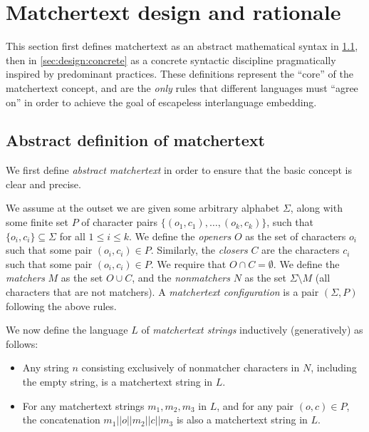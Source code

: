 \section{Matchertext design and rationale}
\label{sec:design}

This section first defines matchertext 
as an abstract mathematical syntax in \cref{sec:design:abstract},
then in \cref{sec:design:concrete}
as a concrete syntactic discipline
pragmatically inspired by predominant practices.
These definitions represent the ``core'' of the matchertext concept,
and are the \emph{only} rules
that different languages must ``agree on''
in order to achieve the goal of escapeless interlanguage embedding.

\subsection{Abstract definition of matchertext}
\label{sec:design:abstract}

We first define \emph{abstract matchertext}
in order to ensure that the basic concept is clear and precise.


We assume at the outset we are given some arbitrary alphabet $\Sigma$,
along with some finite set $P$ of character pairs 
$\{(o_1,c_1),\dots,(o_k,c_k)\}$,
such that $\{o_i, c_i\} \subseteq \Sigma$ for all $1 \le i \le k$.
We define the \emph{openers} $O$ as the set of characters $o_i$
such that some pair $(o_i, c_i) \in P$.
Similarly, the \emph{closers} $C$ are the characters $c_i$
such that some pair $(o_i, c_i) \in P$.
We require that $O \cap C = \emptyset$.
We define the \emph{matchers} $M$ as the set $O \cup C$,
and the \emph{nonmatchers} $N$ as the set $\Sigma \setminus M$
(\ie all characters that are not matchers).
A \emph{matchertext configuration}
is a pair $(\Sigma, P)$ following the above rules.

We now define the language $L$ of \emph{matchertext strings}
inductively (\ie generatively) as follows:
\begin{itemize}
\item	Any string $n$ consisting exclusively of nonmatcher characters in $N$,
	including the empty string,
	is a matchertext string in $L$.
\item	For any matchertext strings $m_1,m_2,m_3$ in $L$,
	and for any pair $(o,c) \in P$,
	the concatenation $m_1||o||m_2||c||m_3$
	is also a matchertext string in $L$.
\end{itemize}

